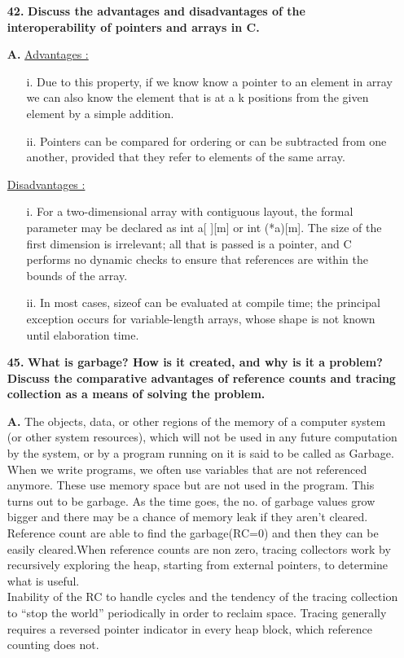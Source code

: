 \documentclass[letterpaper]{article}
\begin{document}
\begin{large}
\begin{flushleft}
\begin{enumerate}
\item[\textbf{42.}]
\textbf{Discuss the advantages and disadvantages of the interoperability of pointers and arrays in C.}
\item[\textbf{A.}]
\underline{Advantages :}
\begin{enumerate}
\item[i.]
Due to this property, if we know know a pointer to an element in array we can also know the element that is at a k positions from the given element by a simple addition. 
\item[ii.]
Pointers can be compared for ordering or can be subtracted from one another, provided that they refer to elements of the same array. 
\end{enumerate}
\underline{Disadvantages :}
\begin{enumerate}
\item[i.]
For a two-dimensional array with contiguous layout, the formal parameter may be declared as int a[ ][m] or int (*a)[m]. The size of the first dimension is irrelevant; all that is passed is a pointer, and C performs no dynamic checks to ensure that references are within the bounds of the array.
\item[ii.]
In most cases, sizeof can be evaluated at compile time; the principal exception occurs for variable-length arrays, whose shape is not known until elaboration time.\\[0.2in]
\end{enumerate}

\item[\textbf{45.}]
\textbf{What is garbage? How is it created, and why is it a problem? Discuss the comparative advantages of reference counts and tracing collection as a means of solving the problem.}
\item[\textbf{A.}]
The objects, data, or other regions of the memory of a computer system (or other system resources), which will not be used in any future computation by the system, or by a program running on it is said to be called as Garbage.\\
When we write programs, we often use variables that are not referenced anymore. These use memory space but are not used in the program. This turns out to be garbage. As the time goes, the no. of garbage values grow bigger and there may be a chance of memory leak if they aren't cleared.\\
Reference count are able to find the garbage(RC=0) and then they can be easily cleared.When reference counts are non zero, tracing collectors work by recursively exploring the heap, starting from external pointers, to determine what is useful.\\
Inability of the RC to handle cycles and the tendency of the tracing collection to “stop the world” periodically in order to reclaim space. Tracing generally requires a reversed pointer indicator in every heap
block, which reference counting does not.\\[0.2in]
  

\end{enumerate}
\end{flushleft}
\end{large}
\end{document}
